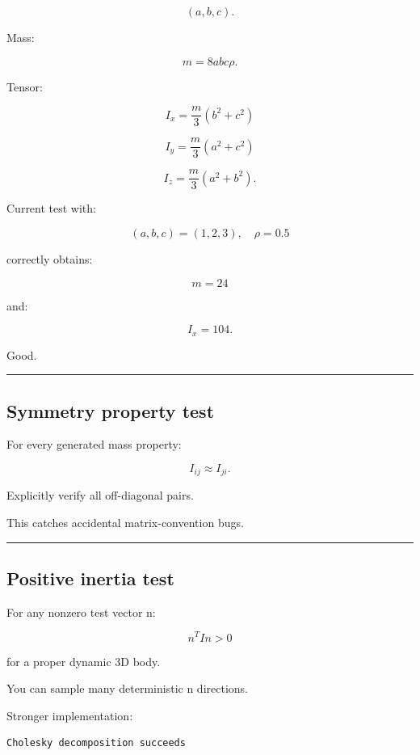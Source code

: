\[
(a,b,c).
\]

Mass:

\[
m=8abc\rho.
\]

Tensor:

\[
I_x
=
\frac m3(b^2+c^2)
\]

\[
I_y
=
\frac m3(a^2+c^2)
\]

\[
I_z
=
\frac m3(a^2+b^2).
\]

Current test with:

\[
(a,b,c)=(1,2,3),
\quad
\rho=0.5
\]

correctly obtains:

\[
m=24
\]

and:

\[
I_x=104.
\]

Good.

\begin{center}\rule{0.5\linewidth}{0.5pt}\end{center}

\subsection{Symmetry property test}\label{06-engine-ii-ch039-symmetry-property-test}

For every generated mass property:

\[
\boxed{
I_{ij}\approx I_{ji}.
}
\]

Explicitly verify all off-diagonal pairs.

This catches accidental matrix-convention bugs.

\begin{center}\rule{0.5\linewidth}{0.5pt}\end{center}

\subsection{Positive inertia test}\label{06-engine-ii-ch039-positive-inertia-test}

For any nonzero test vector n:

\[
\boxed{
n^TIn>0
}
\]

for a proper dynamic 3D body.

You can sample many deterministic n directions.

Stronger implementation:

\begin{verbatim}
Cholesky decomposition succeeds
\end{verbatim}


